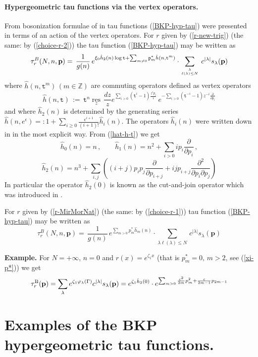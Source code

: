 \documentclass[a4paper,10pt]{article}
\newcommand{\bpow}{\mathbf{p}}
\theoremstyle{plain}
\theoremstyle{remark}
\def\res{\mathop{\mathrm {res}}\limits_}
\def\be{\begin{equation}}
\def\ee{\end{equation}}
\def\res{\mathop{\mathrm {res}}\limits}
\begin{document}
 \paragraph{Hypergeometric tau functions via the vertex operators.} From bosonization formulae of \cite{JM}
 in \cite{OST-I} tau functions (\ref{BKP-hyp-tau}) were presented in terms of an action of the vertex operators.
 For $r$ given by (\ref{r-new-trig}) (the same: by (\ref{choice-r-2})) the tau function (\ref{BKP-hyp-tau}) may be written as
 \be\label{tau-via-vertex-t}
 \tau_r^B(N,n,\bpow) =\,\frac{1}{g(n)}\,
 e^{\xi_0 {\hat h}_2(n) \log\texttt{t} +\sum_{m\neq 0} \texttt{p}^*_m {\hat h}(n,\texttt{t}^m)}
 \cdot \sum_{\lambda\atop \ell(\lambda)\le N}\,c^{|\lambda|}s_\lambda(\bpow)
\ee
where ${\hat h}(n,\texttt{t}^m) \, (m\in\mathbb{Z})$ are commuting operators defined as vertex operators
\be\label{hat-h-t}
{\hat h}(n,\texttt{t})\, :=\, \texttt{t}^{n}\res_z \,\frac {dz}{z}
e^{\sum_{i>0} (\texttt{t}^i-1) \frac{z^i p_i}{i}   }\,
e^{-\sum_{i>0} (\texttt{t}^{-i}-1) z^{-i} \frac{\partial }{\partial p_i} }
\ee
and where ${\hat h}_2(n)$ is determined by the generating series
${\hat h}(n,e^{\epsilon})=: 1+ \sum_{i\ge 0} \frac{\epsilon^{i+1}}{(i+1)!} {\hat h}_i(n)$.
The operators ${\hat h}_i(n)$ were written down in \cite{AMMN-2011} in the most explicit way.
From (\ref{hat-h-t}) we get
\[
{\hat h}_0(n) = n\,,\qquad {\hat h}_1(n) = n^2 + \sum_{i>0} ip_i\frac{\partial}{\partial p_i}\,,
\]
\be
{\hat h}_2(n)= n^3 + \sum_{i,j}
\left((i+j)p_ip_j\frac{\partial}{\partial p_{i+j}} + ij p_{i+j}\frac{\partial^2}{\partial p_{i}\partial p_{j}}\right)
\ee
In particular the operator ${\hat h}_2(0)$ is known as the cut-and-join operator which was introduced in \cite{GJ}.

For $r$ given by (\ref{r-MirMorNat}) (the same: by (\ref{choice-r-1})) tau function (\ref{BKP-hyp-tau}) may be written as
\[
 \tau_r^B(N,n,\bpow)=\,\frac{1}{g(n)}\,e^{\sum_{m>0} p^*_m {\hat h}_m(n) }
 \cdot \sum_{\lambda\ell(\lambda)\le N}\,c^{|\lambda|} s_\lambda(\bpow)
\]


{\bf Example.} For $N=+\infty$, $n=0$ and $r(x)=e^{\zeta_1 x}$ (that is $p^*_m=0,\,m>2$, see (\ref{xi-p*}))
 we get
\be\label{Example-vertex}
\tau^{\rm B}_r(\bpow) =\sum_{\lambda} e^{\zeta_1 \varphi_\lambda(\Gamma)}c^{|\lambda|} s_\lambda(\bpow)
=e^{\zeta_1 {\hat h}_2(0)}\cdot
e^{\sum_{m>0} \frac {c^2}{2m}p_m^2 +\frac{c}{2m-1}p_{2m-1}}
\ee



\section{Examples of the BKP hypergeometric tau functions.\label{Examples-tau-subsection}}
\end{document}
